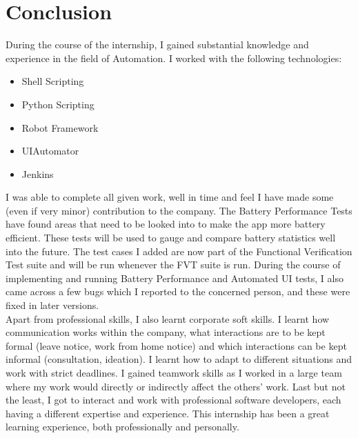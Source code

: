 \setlength\parindent{0pt}

\chapter{Conclusion}

During the course of the internship, I gained substantial knowledge and experience in the field of Automation. I worked with the following technologies:
\begin{itemize}
	\item Shell Scripting
	\item Python Scripting
	\item Robot Framework
	\item UIAutomator
	\item Jenkins
\end{itemize}

I was able to complete all given work, well in time and feel I have made some (even if very minor) contribution to the company. The Battery Performance Tests have found areas that need to be looked into to make the app more battery efficient. These tests will be used to gauge and compare battery statistics well into the future. The test cases I added are now part of the Functional Verification Test suite and will be run whenever the FVT suite is run. During the course of implementing and running Battery Performance and Automated UI tests, I also came across a few bugs which I reported to the concerned person, and these were fixed in later versions. \\

Apart from professional skills, I also learnt corporate soft skills. I learnt how communication works within the company, what interactions are to be kept formal (leave notice, work from home notice) and which interactions can be kept informal (consultation, ideation). I learnt how to adapt to different situations and work with strict deadlines. I gained teamwork skills as I worked in a large team where my work would directly or indirectly affect the others' work. Last but not the least, I got to interact and work with professional software developers, each having a different expertise and experience. This internship has been a great learning experience, both professionally and personally.
